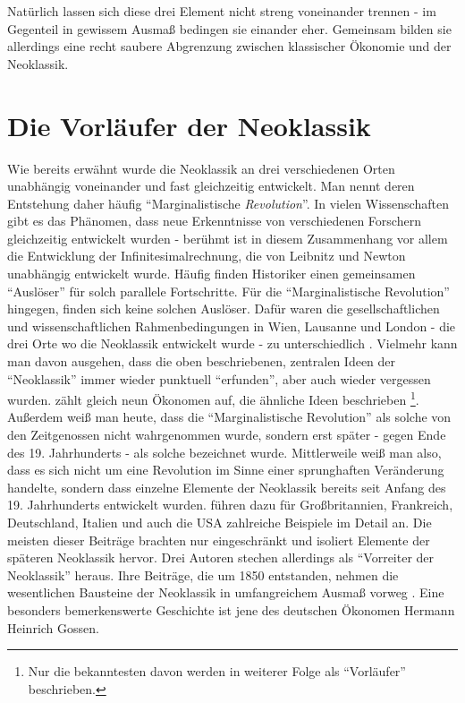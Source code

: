 Natürlich lassen sich diese drei Element nicht streng voneinander trennen - im Gegenteil in gewissem Ausmaß bedingen sie einander eher. Gemeinsam bilden sie allerdings eine recht saubere Abgrenzung zwischen klassischer Ökonomie und der Neoklassik.


\section{Die Vorläufer der Neoklassik}
\label{Vorläufer}

Wie bereits erwähnt wurde die Neoklassik an drei verschiedenen Orten unabhängig voneinander und fast gleichzeitig entwickelt. Man nennt deren Entstehung daher häufig "`Marginalistische \textit{Revolution}"'. In vielen Wissenschaften gibt es das Phänomen, dass neue Erkenntnisse von verschiedenen Forschern gleichzeitig entwickelt wurden - berühmt ist in diesem Zusammenhang vor allem die Entwicklung der Infinitesimalrechnung, die von Leibnitz und Newton unabhängig entwickelt wurde. Häufig finden Historiker einen gemeinsamen "`Auslöser"' für solch parallele Fortschritte. Für die "`Marginalistische Revolution"' hingegen, finden sich keine solchen Auslöser. Dafür waren die gesellschaftlichen und wissenschaftlichen Rahmenbedingungen in Wien, Lausanne und London - die drei Orte wo die Neoklassik entwickelt wurde - zu unterschiedlich \parencite[S. 269]{Blaug1973}. Vielmehr kann man davon ausgehen, dass die oben beschriebenen, zentralen Ideen der "`Neoklassik"' immer wieder punktuell "`erfunden"', aber auch wieder vergessen wurden. \textcite[S. 274]{Blaug1973} zählt gleich neun Ökonomen auf, die ähnliche Ideen beschrieben \footnote{Nur die bekanntesten davon werden in weiterer Folge als "`Vorläufer"' beschrieben.}. Außerdem weiß man heute, dass die "`Marginalistische Revolution"' als solche von den Zeitgenossen nicht wahrgenommen wurde, sondern erst später - gegen Ende des 19. Jahrhunderts - als solche bezeichnet wurde.
Mittlerweile weiß man also, dass es sich nicht um eine Revolution im Sinne einer sprunghaften Veränderung handelte, sondern dass einzelne Elemente der Neoklassik bereits seit Anfang des 19. Jahrhunderts entwickelt wurden. \textcite{Ekelund2002} führen dazu für Großbritannien, Frankreich, Deutschland, Italien und auch die USA zahlreiche Beispiele im Detail an. Die meisten dieser Beiträge brachten nur eingeschränkt und isoliert Elemente der späteren Neoklassik hervor. Drei Autoren stechen allerdings als "`Vorreiter der Neoklassik"' heraus. Ihre Beiträge, die um 1850 entstanden, nehmen die wesentlichen Bausteine der Neoklassik in umfangreichem Ausmaß vorweg \parencite[S. 205]{Ekelund2002}. Eine besonders bemerkenswerte Geschichte ist jene des deutschen Ökonomen Hermann Heinrich Gossen.


